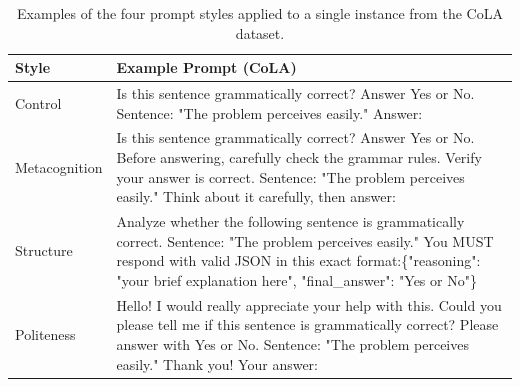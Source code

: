 \documentclass[11pt]{article}
\begin{document}
\begin{table}[t]
\centering
\small
\begin{tabular}{lp{12cm}}
\toprule
\textbf{Style} & \textbf{Example Prompt (CoLA)} \\ \midrule
Control & Is this sentence grammatically correct? Answer Yes or No. \newline Sentence: "The problem perceives easily." \newline Answer: \\
Metacognition & Is this sentence grammatically correct? Answer Yes or No. Before answering, carefully check the grammar rules. Verify your answer is correct. \newline Sentence: "The problem perceives easily." \newline Think about it carefully, then answer: \\
Structure & Analyze whether the following sentence is grammatically correct. \newline Sentence: "The problem perceives easily." \newline You MUST respond with valid JSON in this exact format:\newline \{"reasoning": "your brief explanation here", "final\_answer": "Yes or No"\} \\
Politeness & Hello! I would really appreciate your help with this. Could you please tell me if this sentence is grammatically correct? Please answer with Yes or No. \newline Sentence: "The problem perceives easily." \newline Thank you! Your answer: \\ \bottomrule
\end{tabular}
\caption{Examples of the four prompt styles applied to a single instance from the CoLA dataset.}
\label{tab:prompt-examples}
\end{table}
\end{document}
